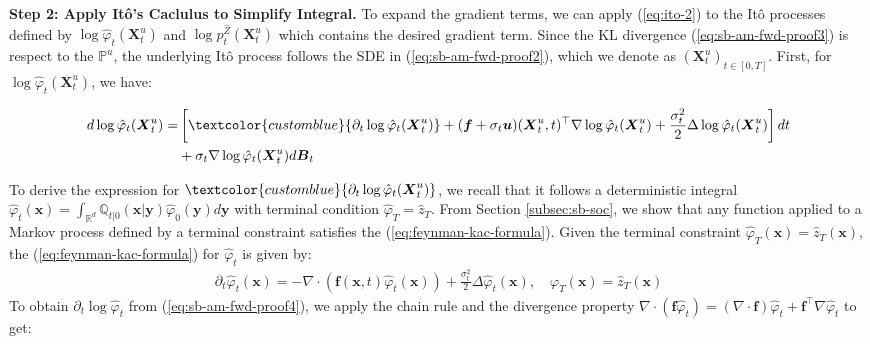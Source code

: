 \documentclass{article}
\newcommand{\bluetext}[1]{\textcolor{customblue}{#1}}
\begin{document}
\textbf{Step 2: Apply Itô's Caclulus to Simplify Integral. }
To expand the gradient terms, we can apply (\ref{eq:ito-2}) to the Itô processes defined by $\log \hat{\varphi}_t(\boldsymbol{X}^u_t)$ and $\log p_t^{\widehat{Z}}(\boldsymbol{X}^u_t)$ which contains the desired gradient term. Since the KL divergence (\ref{eq:sb-am-fwd-proof3}) is respect to the $\mathbb{P}^u$, the underlying Itô process follows the SDE in (\ref{eq:sb-am-fwd-proof2}), which we denote as $(\boldsymbol{X}_t^u)_{t\in [0,T]}$. First, for $\log \hat{\varphi}_t(\boldsymbol{X}^u_t)$, we have:
\begin{small}
\begin{align}
    d\log \hat{\varphi}_t(\boldsymbol{X}^u_t)=&\left[\bluetext{\partial_t\log \hat{\varphi}_t(\boldsymbol{X}^u_t)}+(\boldsymbol{f}+\sigma_t \boldsymbol{u})(\boldsymbol{X}^u_t,t)^{\top}\nabla \log \hat{\varphi}_t(\boldsymbol{X}^u_t)+\frac{\sigma_t^2}{2}\Delta \log \hat{\varphi}_t(\boldsymbol{X}^u_t)\right]dt\nonumber\\
    &+\sigma_t\nabla \log \hat{\varphi}_t(\boldsymbol{X}^u_t)d\boldsymbol{B}_t\label{eq:sb-am-fwd-proof6}
\end{align}
\end{small}
To derive the expression for $\bluetext{\partial_t\log \hat{\varphi}_t(\boldsymbol{X}^u_t)}$, we recall that it follows a deterministic integral $\hat{\varphi}_t(\boldsymbol{x})=\int_{\mathbb{R}^d}\mathbb{Q}_{t|0}(\boldsymbol{x}|\boldsymbol{y})\hat{\varphi}_0(\boldsymbol{y})d\boldsymbol{y}$ with terminal condition $\hat{\varphi}_T=\hat{z}_T$. From Section \ref{subsec:sb-soc}, we show that any function applied to a Markov process defined by a terminal constraint satisfies the (\ref{eq:feynman-kac-formula}). Given the terminal constraint $\hat\varphi_T(\boldsymbol{x})=\hat{z}_T(\boldsymbol{x})$, the (\ref{eq:feynman-kac-formula}) for $\hat\varphi_t$ is given by:
\begin{align}
    \partial_t\hat{\varphi}_t(\boldsymbol{x})=-\nabla \cdot (\boldsymbol{f}(\boldsymbol{x},t)\hat\varphi_t(\boldsymbol{x}))+\frac{\sigma^2_t}{2}\Delta \hat\varphi_t(\boldsymbol{x}), \quad\varphi_T(\boldsymbol{x})=\hat{z}_T(\boldsymbol{x})\label{eq:sb-am-fwd-proof4}
\end{align}
To obtain $\partial_t\log \hat\varphi_t$ from (\ref{eq:sb-am-fwd-proof4}), we apply the chain rule and the divergence property $\nabla\cdot (\boldsymbol{f}\hat\varphi_t)=(\nabla \cdot \boldsymbol{f})\hat\varphi_t+\boldsymbol{f}^\top \nabla \hat\varphi_t$ to get:
\end{document}
